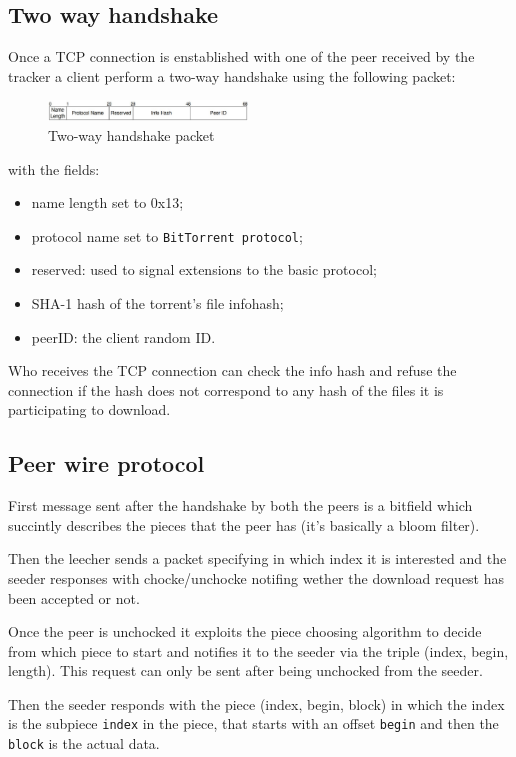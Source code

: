 \subsection{Two way handshake}
Once a TCP connection is enstablished with one of the peer received by the tracker a client perform a two-way handshake using the following packet:
\begin{figure}[H]
    \centering
    \includegraphics[width=200px]{images/3_DHT/08.png}
    \caption{Two-way handshake packet}
\end{figure}
with the fields:
\begin{itemize}
    \item name length set to 0x13;
    \item protocol name set to \verb|BitTorrent protocol|;
    \item reserved: used to signal extensions to the basic protocol;
    \item SHA-1 hash of the torrent's file infohash;
    \item peerID: the client random ID.
\end{itemize}
Who receives the TCP connection can check the info hash and refuse the connection if the hash does not correspond to any hash of the files it is participating to download.

\subsection{Peer wire protocol}
First message sent after the handshake by both the peers is a bitfield which succintly describes the pieces that the peer has (it's basically a bloom filter).

Then the leecher sends a packet specifying in which index it is interested and the seeder responses with chocke/unchocke notifing wether the download request has been accepted or not.

Once the peer is unchocked it exploits the piece choosing algorithm to decide from which piece to start and notifies it to the seeder via the triple (index, begin, length).
This request can only be sent after being unchocked from the seeder.

Then the seeder responds with the piece (index, begin, block) in which the index is the subpiece \verb|index| in the piece, that starts with an offset \verb|begin| and then the \verb|block| is the actual data.

